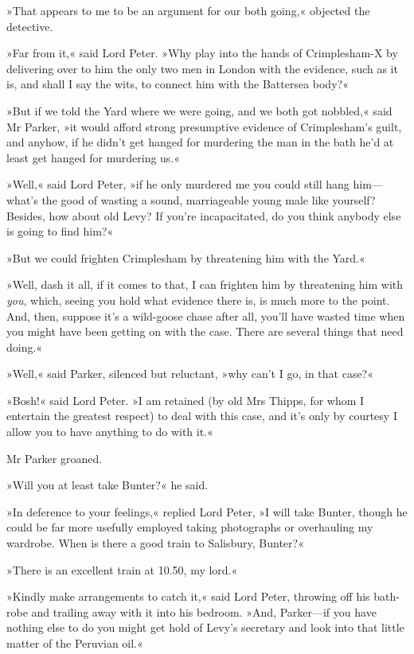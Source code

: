 »That appears to me to be an argument for our both going,« objected the detective.

»Far from it,« said Lord Peter. »Why play into the hands of Crimplesham-X by delivering over to him the only two men in London with the evidence, such as it is, and shall I say the wits, to connect him with the Battersea body?«

»But if we told the Yard where we were going, and we both got nobbled,« said Mr Parker, »it would afford strong presumptive evidence of Crimplesham's guilt, and anyhow, if he didn't get hanged for murdering the man in the bath he'd at least get hanged for murdering us.«

»Well,« said Lord Peter, »if he only murdered me you could still hang him—what's the good of wasting a sound, marriageable young male like yourself? Besides, how about old Levy? If you're incapacitated, do you think anybody else is going to find him?«

»But we could frighten Crimplesham by threatening him with the Yard.«

»Well, dash it all, if it comes to that, I can frighten him by threatening him with \textit{you}, which, seeing you hold what evidence there is, is much more to the point. And, then, suppose it's a wild-goose chase after all, you'll have wasted time when you might have been getting on with the case. There are several things that need doing.«

»Well,« said Parker, silenced but reluctant, »why can't I go, in that case?«

»Bosh!« said Lord Peter. »I am retained (by old Mrs Thipps, for whom I entertain the greatest respect) to deal with this case, and it's only by courtesy I allow you to have anything to do with it.«

Mr Parker groaned.

»Will you at least take Bunter?« he said.

»In deference to your feelings,« replied Lord Peter, »I will take Bunter, though he could be far more usefully employed taking photographs or overhauling my wardrobe. When is there a good train to Salisbury, Bunter?«

»There is an excellent train at 10.50, my lord.«

»Kindly make arrangements to catch it,« said Lord Peter, throwing off his bath-robe and trailing away with it into his bedroom. »And, Parker—if you have nothing else to do you might get hold of Levy's secretary and look into that little matter of the Peruvian oil.«

